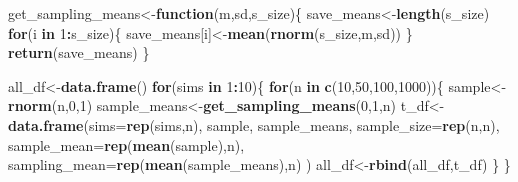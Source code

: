 \documentclass[]{book}
\newenvironment{Shaded}{\begin{snugshade}}{\end{snugshade}}
\newcommand{\ControlFlowTok}[1]{\textcolor[rgb]{0.13,0.29,0.53}{\textbf{#1}}}
\newcommand{\DataTypeTok}[1]{\textcolor[rgb]{0.13,0.29,0.53}{#1}}
\newcommand{\DecValTok}[1]{\textcolor[rgb]{0.00,0.00,0.81}{#1}}
\newcommand{\KeywordTok}[1]{\textcolor[rgb]{0.13,0.29,0.53}{\textbf{#1}}}
\newcommand{\NormalTok}[1]{#1}
\newcommand{\OperatorTok}[1]{\textcolor[rgb]{0.81,0.36,0.00}{\textbf{#1}}}
\begin{document}
\begin{Shaded}
\begin{Highlighting}[]
\NormalTok{get_sampling_means<-}\ControlFlowTok{function}\NormalTok{(m,sd,s_size)\{}
\NormalTok{  save_means<-}\KeywordTok{length}\NormalTok{(s_size)}
  \ControlFlowTok{for}\NormalTok{(i }\ControlFlowTok{in} \DecValTok{1}\OperatorTok{:}\NormalTok{s_size)\{}
\NormalTok{    save_means[i]<-}\KeywordTok{mean}\NormalTok{(}\KeywordTok{rnorm}\NormalTok{(s_size,m,sd))}
\NormalTok{  \}}
  \KeywordTok{return}\NormalTok{(save_means)}
\NormalTok{\}}

\NormalTok{all_df<-}\KeywordTok{data.frame}\NormalTok{()}
\ControlFlowTok{for}\NormalTok{(sims }\ControlFlowTok{in} \DecValTok{1}\OperatorTok{:}\DecValTok{10}\NormalTok{)\{}
  \ControlFlowTok{for}\NormalTok{(n }\ControlFlowTok{in} \KeywordTok{c}\NormalTok{(}\DecValTok{10}\NormalTok{,}\DecValTok{50}\NormalTok{,}\DecValTok{100}\NormalTok{,}\DecValTok{1000}\NormalTok{))\{}
\NormalTok{    sample<-}\KeywordTok{rnorm}\NormalTok{(n,}\DecValTok{0}\NormalTok{,}\DecValTok{1}\NormalTok{)}
\NormalTok{    sample_means<-}\KeywordTok{get_sampling_means}\NormalTok{(}\DecValTok{0}\NormalTok{,}\DecValTok{1}\NormalTok{,n)}
\NormalTok{    t_df<-}\KeywordTok{data.frame}\NormalTok{(}\DataTypeTok{sims=}\KeywordTok{rep}\NormalTok{(sims,n),}
\NormalTok{                     sample,}
\NormalTok{                     sample_means,}
                     \DataTypeTok{sample_size=}\KeywordTok{rep}\NormalTok{(n,n),}
                     \DataTypeTok{sample_mean=}\KeywordTok{rep}\NormalTok{(}\KeywordTok{mean}\NormalTok{(sample),n),}
                     \DataTypeTok{sampling_mean=}\KeywordTok{rep}\NormalTok{(}\KeywordTok{mean}\NormalTok{(sample_means),n)}
\NormalTok{                     )}
\NormalTok{    all_df<-}\KeywordTok{rbind}\NormalTok{(all_df,t_df)}
\NormalTok{  \}}
\NormalTok{\}}



\end{Highlighting}
\end{Shaded}
\end{document}
